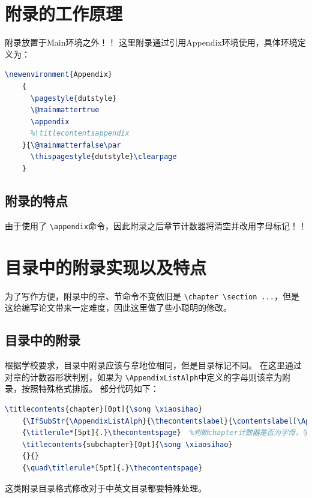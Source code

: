 \documentclass[doctor]{dutthesis} %
\begin{document}
\tableoffigurecontents
\tableoftablecontents
\stcleardp



\begin{Main} %




\end{Main} %
\begin{Appendix}
    \chapter{附录的工作原理}
    附录放置于Main环境之外！！
    这里附录通过引用Appendix环境使用，具体环境定义为：
    \begin{lstlisting}[language=TeX]
	\newenvironment{Appendix}
	{
	  \pagestyle{dutstyle}
	  \@mainmattertrue
	  \appendix
	  %\titlecontentsappendix
	}{\@mainmatterfalse\par
	  \thispagestyle{dutstyle}\clearpage
	}
    \end{lstlisting}


    \section{附录的特点}
    由于使用了 \lstinline|\appendix|命令，因此附录之后章节计数器将清空并改用字母标记！！ 
    \chapter{目录中的附录实现以及特点}
    为了写作方便，附录中的章、节命令不变依旧是 \lstinline|\chapter \section ...|，但是这给编写论文带来一定难度，因此这里做了些小聪明的修改。
    \section{目录中的附录}
    根据学校要求，目录中附录应该与章地位相同，但是目录标记不同。
    在这里通过对章的计数器形状判别，如果为 \lstinline|\AppendixListAlph|中定义的字母则该章为附录，按照特殊格式排版。 
    部分代码如下：
    \begin{lstlisting}[language=TeX]
	\titlecontents{chapter}[0pt]{\song \xiaosihao}
	{\IfSubStr{\AppendixListAlph}{\thecontentslabel}{\contentslabel[\AppendixTOCName~\thecontentslabel]{0mm}\phantom{\AppendixTOCName~\thecontentslabel}\quad}{\thecontentslabel\quad}}{}
	{\titlerule*[5pt]{.}\thecontentspage}  %判断chapter计数器是否为字母，字母则为附录
	\titlecontents{subchapter}[0pt]{\song \xiaosihao}
	{}{}
	{\quad\titlerule*[5pt]{.}\thecontentspage}
    \end{lstlisting}
    这类附录目录格式修改对于中英文目录都要特殊处理。


\end{Appendix}
\end{document}
